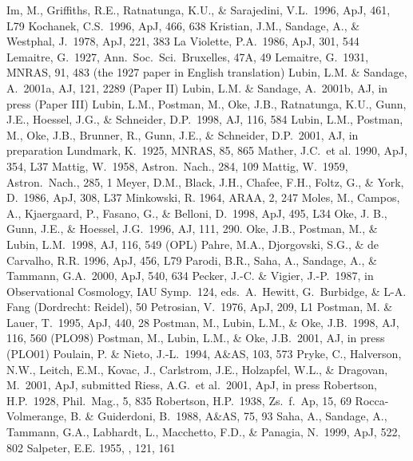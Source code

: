 \documentclass[preprint]{aastex}
\begin{document}
\begin{thebibliography}{}
\bibitem[]{}Im, M., Griffiths, R.E., Ratnatunga, K.U., \& Sarajedini,
V.L.\ 1996, ApJ, 461, L79
\bibitem[]{}Kochanek, C.S.\ 1996, ApJ, 466, 638
\bibitem[]{}Kristian, J.M., Sandage, A., \& Westphal, J.\ 1978, ApJ, 221, 383 
\bibitem[]{}La Violette, P.A.\ 1986, ApJ, 301, 544
\bibitem[]{}Lemaitre, G.\ 1927, Ann.\ Soc.\ Sci.\ Bruxelles, 47A, 49
\bibitem[]{}Lemaitre, G.\ 1931, MNRAS, 91, 483 (the 1927 paper in
English translation)
\bibitem[]{}Lubin, L.M. \& Sandage, A.\ 2001a, AJ, 121, 2289 (Paper II)  
\bibitem[]{}Lubin, L.M. \& Sandage, A.\ 2001b, AJ, in press (Paper III) 
\bibitem[]{}Lubin, L.M., Postman, M., Oke, J.B., Ratnatunga, K.U., Gunn, 
   J.E., Hoessel, J.G., \& Schneider, D.P.\ 1998, AJ, 116, 584
\bibitem[]{}Lubin, L.M., Postman, M., Oke, J.B., Brunner, R., Gunn, J.E., \& 
   Schneider, D.P.\ 2001, AJ, in preparation 
\bibitem[]{}Lundmark, K.\ 1925, MNRAS, 85, 865
\bibitem[]{}Mather, J.C.\ et al. 1990, ApJ, 354, L37
\bibitem[]{}Mattig, W.\ 1958, Astron.\ Nach., 284, 109 
\bibitem[]{}Mattig, W.\ 1959, Astron.\ Nach., 285, 1 
\bibitem[]{}Meyer, D.M., Black, J.H., Chafee, F.H., Foltz, G., \& York,
D.\ 1986, ApJ, 308, L37
\bibitem[]{}Minkowski, R. 1964, ARAA, 2, 247
\bibitem[]{}Moles, M., Campos, A., Kjaergaard, P., Fasano, G., \&
Belloni, D.\ 1998, ApJ, 495, L34
\bibitem[]{} Oke, J. B., Gunn, J.E., \& Hoessel, J.G.\ 1996, AJ, 111,
290.
\bibitem[]{}Oke, J.B., Postman, M., \& Lubin, L.M.\ 1998, AJ, 116, 549 (OPL)
\bibitem[]{}Pahre, M.A., Djorgovski, S.G., \& de Carvalho, R.R. 1996,
ApJ, 456, L79
\bibitem[]{}Parodi, B.R., Saha, A., Sandage, A., \& Tammann, G.A.\
2000, ApJ, 540, 634
\bibitem[]{}Pecker, J.-C. \& Vigier, J.-P.\ 1987, in Observational
Cosmology, IAU Symp.\ 124, eds.\ A.\ Hewitt, G.\ Burbidge, \&
L-A. Fang (Dordrecht: Reidel), 50
\bibitem[]{}Petrosian, V.\ 1976, ApJ, 209, L1
\bibitem[]{}Postman, M. \& Lauer, T.\ 1995, ApJ, 440, 28
\bibitem[]{}Postman, M., Lubin, L.M., \& Oke, J.B.\ 1998, AJ, 116, 560 (PLO98)
\bibitem[]{}Postman, M., Lubin, L.M., \& Oke, J.B.\ 2001, AJ, in press (PLO01)
\bibitem[]{}Poulain, P. \& Nieto, J.-L.\ 1994, A\&AS, 103, 573
\bibitem[]{}Pryke, C., Halverson, N.W., Leitch, E.M., Kovac, J.,
Carlstrom, J.E., Holzapfel, W.L., \& Dragovan, M.\ 2001, ApJ,
submitted
\bibitem[]{}Riess, A.G.\ et al.\ 2001, ApJ, in press
\bibitem[]{}Robertson, H.P.\ 1928, Phil.\ Mag., 5, 835
\bibitem[]{}Robertson, H.P.\ 1938, Zs.\ f.\ Ap, 15, 69
\bibitem[]{}Rocca-Volmerange, B. \& Guiderdoni, B.\ 1988, A\&AS, 75, 93
\bibitem[]{}Saha, A., Sandage, A., Tammann, G.A., Labhardt, L.,
Macchetto, F.D., \& Panagia, N.\ 1999, ApJ, 522, 802
\bibitem[]{}Salpeter, E.E. 1955, \apj, 121, 161

\end{thebibliography}
\end{document}

